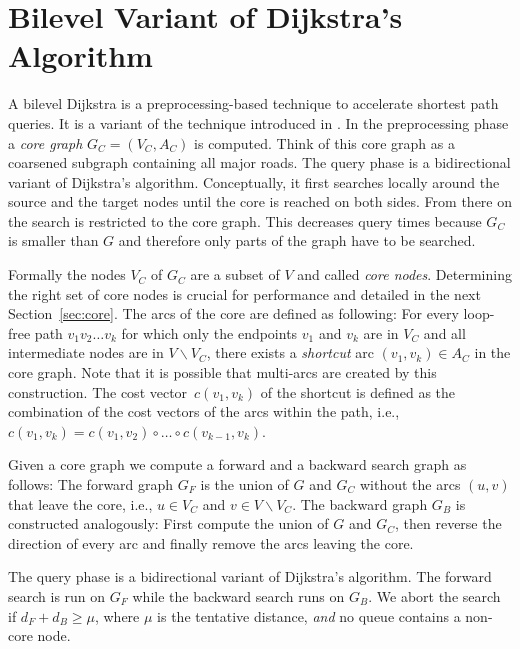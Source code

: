 \documentclass{sig-alternate}
\newcommand{\arccost}{\ensuremath{c}}
\begin{document}
\section{Bilevel Variant of Dijkstra's Algorithm}\label{sec:Bilevel-Dijkstra}


A bilevel Dijkstra is a preprocessing-based technique to accelerate
shortest path queries. It is a variant of the technique introduced
in \cite{sww-daola-00}. In the preprocessing phase a \emph{core graph}
$G_{C}=(V_{C},A_{C})$ is computed. Think of this core graph as a
coarsened subgraph containing all major roads. The query phase is a bidirectional
variant of Dijkstra's algorithm. Conceptually, it first searches locally around
the source and the target nodes until the core is reached on both
sides. From there on the search is restricted to the core graph.
This decreases query times because $G_{C}$ is smaller than $G$ and
therefore only parts of the graph have to be searched.

Formally the nodes $V_{C}$ of $G_{C}$ are a subset of $V$ and called
\emph{core nodes}. Determining the right set of core nodes is crucial
for performance and detailed in the next Section~\ref{sec:core}.
The arcs of the core are defined as following: For every loop-free path $v_{1}v_{2}\ldots v_{k}$
for which only the endpoints $v_1$ and $v_k$ are in $V_{C}$ and all intermediate nodes
are in $V\backslash V_{C}$, there exists a \emph{shortcut} arc $(v_{1},v_{k})\in A_{C}$
in the core graph. Note that it is possible that multi-arcs are created
by this construction. The cost vector~$\arccost(v_{1},v_{k})$ of the shortcut is defined
as the combination of the cost vectors of the arcs within
the path, i.e., $\arccost(v_{1},v_{k})= \arccost(v_1,v_2)\circ \ldots \circ \arccost(v_{k-1},v_{k})$.

Given a core graph we compute a forward and a backward search graph
as follows: The forward graph $G_{F}$ is the union of $G$ and
$G_{C}$ without the arcs $(u,v)$ that leave the core, i.e., $u\in V_{C}$
and $v\in V\backslash V_{C}$. The backward graph $G_{B}$ is constructed
analogously: First compute the union of $G$ and $G_{C}$,
then reverse the direction of every arc and finally remove the arcs
leaving the core.

The query phase is a bidirectional variant of Dijkstra's algorithm.
The forward search is run on $G_{F}$ while the backward search runs
on $G_{B}$. We abort the search if $d_{F}+d_{B}\ge\mu$, where $\mu$
is the tentative distance, \emph{and} no queue contains a non-core node.
\end{document}
